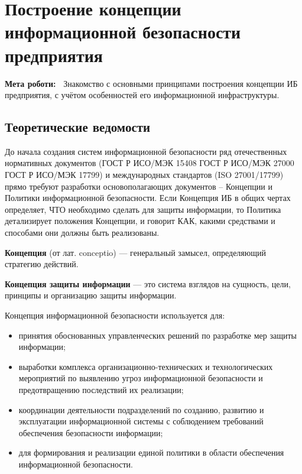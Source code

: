\chapter{Построение концепции информационной безопасности предприятия} \label{chapt4}%
\textbf{Мета роботи:~}%
Знакомство с основными принципами построения концепции ИБ предприятия, с
учётом особенностей его информационной инфраструктуры.
\section{Теоретические ведомости} \label{sect3_a}

До начала создания систем информационной безопасности ряд отечественных
нормативных документов (ГОСТ Р ИСО/МЭК 15408 ГОСТ Р ИСО/МЭК 27000 ГОСТ Р
ИСО/МЭК 17799) и международных стандартов (ISO 27001/17799) прямо требуют
разработки основополагающих документов – Концепции и Политики информационной
безопасности. Если Концепция ИБ в общих чертах определяет, ЧТО необходимо
сделать для защиты информации, то Политика детализирует положения Концепции,
и говорит КАК, какими средствами и способами они должны быть реализованы.

\textbf{Концепция} (от лат. conceptio) --- генеральный замысел, определяющий
стратегию действий.

\textbf{Концепция защиты информации} --- это система взглядов на сущность,
цели, принципы и организацию защиты информации.

Концепция информационной безопасности используется для:
\begin{itemize}
  \item принятия обоснованных управленческих решений по разработке мер
      защиты информации;
  \item выработки комплекса организационно-технических и технологических
      мероприятий по выявлению угроз информационной безопасности и
      предотвращению последствий их реализации;
  \item координации деятельности подразделений по созданию, развитию и
      эксплуатации информационной системы с соблюдением требований
      обеспечения безопасности информации;
  \item для формирования и реализации единой политики в области обеспечения
      информационной безопасности.
\end{itemize}

